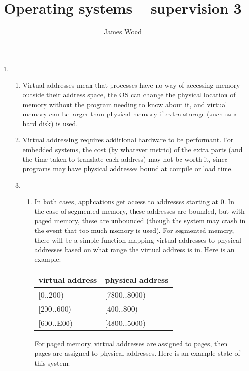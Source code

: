 \documentclass[11pt]{article}
\title{\textbf{Operating systems -- supervision 3}}
\author{James Wood}
\begin{document}
\maketitle

\begin{enumerate}
\item
  \begin{enumerate}
  \item Virtual addresses mean that processes have no way of accessing memory outside their address space, the OS can change the physical location of memory without the program needing to know about it, and virtual memory can be larger than physical memory if extra storage (such as a hard disk) is used.
  \item Virtual addressing requires additional hardware to be performant. For embedded systems, the cost (by whatever metric) of the extra parts (and the time taken to translate each address) may not be worth it, since programs may have physical addresses bound at compile or load time.
  \item
    \begin{enumerate}
    \item
      In both cases, applications get access to addresses starting at 0. In the case of segmented memory, these addresses are bounded, but with paged memory, these are unbounded (though the system may crash in the event that too much memory is used). For segmented memory, there will be a simple function mapping virtual addresses to physical addresses based on what range the virtual address is in. Here is an example:

      \begin{tabular}{l|l}
        virtual address & physical address\\
        \hline
        [0..200) & [7800..8000)\\ \relax
        [200..600) & [400..800)\\ \relax
        [600..E00) & [4800..5000)\\
      \end{tabular}

      For paged memory, virtual addresses are assigned to pages, then pages are assigned to physical addresses. Here is an example state of this system:


\end{enumerate}
\end{enumerate}
\end{enumerate}
\end{document}

